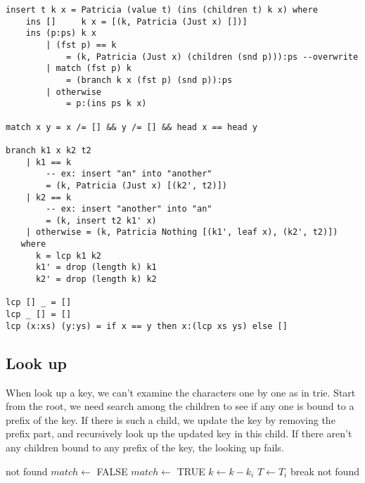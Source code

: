 \documentclass[UTF8]{article}
\begin{document}
\lstset{language=Haskell}
\begin{lstlisting}
insert t k x = Patricia (value t) (ins (children t) k x) where
    ins []     k x = [(k, Patricia (Just x) [])]
    ins (p:ps) k x
        | (fst p) == k
            = (k, Patricia (Just x) (children (snd p))):ps --overwrite
        | match (fst p) k
            = (branch k x (fst p) (snd p)):ps
        | otherwise
            = p:(ins ps k x)

match x y = x /= [] && y /= [] && head x == head y

branch k1 x k2 t2
    | k1 == k
        -- ex: insert "an" into "another"
        = (k, Patricia (Just x) [(k2', t2)])
    | k2 == k
        -- ex: insert "another" into "an"
        = (k, insert t2 k1' x)
    | otherwise = (k, Patricia Nothing [(k1', leaf x), (k2', t2)])
   where
      k = lcp k1 k2
      k1' = drop (length k) k1
      k2' = drop (length k) k2

lcp [] _ = []
lcp _ [] = []
lcp (x:xs) (y:ys) = if x == y then x:(lcp xs ys) else []
\end{lstlisting}


\subsection{Look up}
When look up a key, we can't examine the characters one by one
as in trie. Start from the root, we need search among the children
to see if any one is bound to a prefix of the key.
If there is such a child, we update the key by removing the prefix
part, and recursively look up the updated key in this child.
If there aren't any children bound to any prefix of the key,
the looking up fails.

\begin{algorithmic}[1]
     \State \Return not found
   \EndIf
  \Repeat
    \State $match \gets$ FALSE
        \State \Return {}
      \EndIf
        \State $match \gets$ TRUE
        \State $k \gets k - k_i$
        \State $T \gets T_i$
        \State break
      \EndIf
    \EndFor
  \State \Return not found
\EndFunction
\end{algorithmic}
\end{document}
